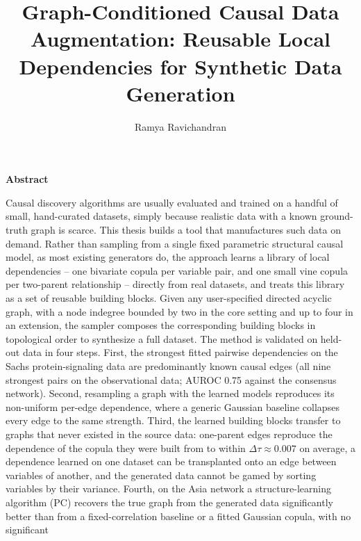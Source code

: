 \documentclass[
  english,
  class=report,
  accentcolor=2c,
  marginpar=false,
  parskip=half-,
  fontsize=11pt,
  ruledheaders=false,
  pdfa=false,
  IMRAD=false,
  thesis={type=master}
]{tudapub}
\newenvironment{centeredabstract}[1][Abstract]{%
  \clearpage
  \thispagestyle{empty}
  \begin{center}
    {\Large \bfseries #1}\\[1em]
    \begin{minipage}{0.8\textwidth}
      \normalsize
}{%
    \end{minipage}
  \end{center}
  \clearpage
}
\begin{document}
\title{Graph-Conditioned Causal Data Augmentation: Reusable Local Dependencies for Synthetic Data Generation}
\author{Ramya Ravichandran}



\maketitle
\affidavit

\begin{centeredabstract}
Causal discovery algorithms are usually evaluated and trained on a handful of small,
hand-curated datasets, simply because realistic data with a known ground-truth
graph is scarce. This thesis builds a tool that manufactures such data on
demand. Rather than sampling from a single fixed parametric structural causal
model, as most existing generators do, the approach learns a library of local
dependencies -- one bivariate copula per variable pair, and one small vine
copula per two-parent relationship -- directly from real datasets, and treats
this library as a set of reusable building blocks. Given any user-specified
directed acyclic graph, with a node indegree bounded by two in the core
setting and up to four in an extension, the sampler composes the corresponding
building blocks in topological order to synthesize a full dataset. The method is
validated on held-out data in four steps. First, the strongest fitted
pairwise dependencies on the Sachs protein-signaling data are predominantly
known causal edges (all nine strongest pairs on the observational data;
AUROC 0.75 against the consensus network). Second, resampling a graph with
the learned models reproduces its non-uniform per-edge dependence, where a
generic Gaussian baseline collapses every edge to the same strength.
Third, the learned building blocks transfer to graphs that never existed
in the source data: one-parent edges reproduce the dependence of the
copula they were built from to within $\Delta\tau \approx 0.007$ on average, a dependence
learned on one dataset can be transplanted onto an edge between variables
of another, and the generated data cannot be gamed by sorting variables by
their variance. Fourth, on the Asia network a structure-learning algorithm (PC) recovers
the true graph from the generated data significantly better than from a
fixed-correlation baseline or a fitted Gaussian copula, with no significant

\end{centeredabstract}
\end{document}
